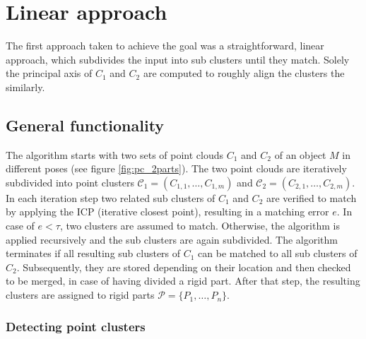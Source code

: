 \chapter{Linear approach}
\label{cha:LinearApproach}

The first approach taken to achieve the goal was a straightforward, linear approach, which subdivides the input into sub clusters until they match. Solely the principal axis of $C_1$ and $C_2$ are computed to roughly align the clusters the similarly. 


\section{General functionality}

The algorithm starts with two sets of point clouds $C_1$ and $C_2$ of an object $M$ in different poses (see figure \ref{fig:pc_2parts}). The two point clouds are iteratively subdivided into point clusters $\mathcal{C}_1 =  (C_{1,1},\ldots, C_{1,m})$ and $\mathcal{C}_2 =  (C_{2,1},\ldots, C_{2,m})$. In each iteration step two related sub clusters of $C_1$ and $C_2$ are verified to match by applying the ICP (iterative closest point), resulting in a matching error $e$. In case of $e < \tau$, two clusters are assumed to match. Otherwise, the algorithm is applied recursively and the sub clusters are again subdivided. The algorithm terminates if all resulting sub clusters of $C_1$ can be matched to all sub clusters of $C_2$. Subsequently, they are stored depending on their location and then checked to be merged, in case of having divided a rigid part. After that step, the resulting clusters are assigned to rigid parts $\mathcal{P} =  \{P_1,\ldots,P_n\}$.

\subsection{Detecting point clusters}

